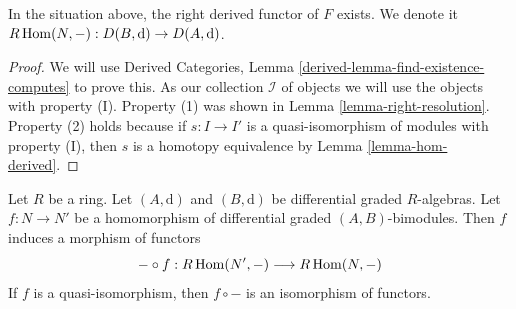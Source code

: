 \begin{lemma}
\label{lemma-derived-restriction}
In the situation above, the right derived functor of $F$ exists.
We denote it $R\mathop{\mathrm{Hom}}\nolimits(N, -) : D(B, \text{d}) \to D(A, \text{d})$.
\end{lemma}

\begin{proof}
We will use
Derived Categories, Lemma \ref{derived-lemma-find-existence-computes}
to prove this. As our collection $\mathcal{I}$
of objects we will use the objects with property (I).
Property (1) was shown in Lemma \ref{lemma-right-resolution}.
Property (2) holds because if $s : I \to I'$ is a quasi-isomorphism
of modules with property (I), then $s$ is a homotopy equivalence
by Lemma \ref{lemma-hom-derived}.
\end{proof}

\begin{lemma}
\label{lemma-functoriality-derived-restriction}
Let $R$ be a ring. Let $(A, \text{d})$ and $(B, \text{d})$ be
differential graded $R$-algebras. Let $f : N \to N'$ be a
homomorphism of differential graded $(A, B)$-bimodules.
Then $f$ induces a morphism of functors
$$
- \circ f : R\mathop{\mathrm{Hom}}\nolimits(N', -) \longrightarrow R\mathop{\mathrm{Hom}}\nolimits(N, -)
$$
If $f$ is a quasi-isomorphism, then $f \circ -$ is an isomorphism of
functors.
\end{lemma}

